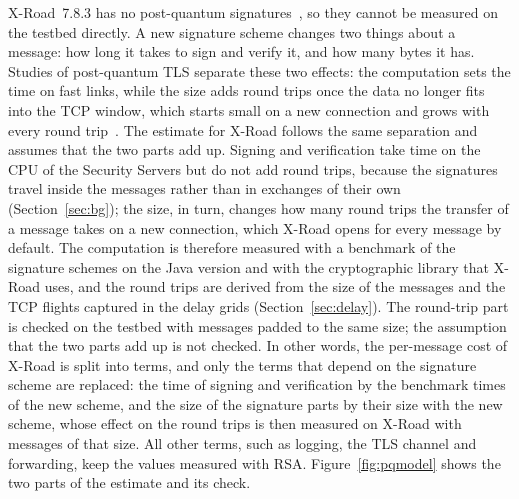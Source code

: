 \documentclass[conference,a4paper]{IEEEtran}
\newcommand{\newtext}[1]{{\color{blue}#1}}
\begin{document}
{\color{blue}X-Road~7.8.3 has no post-quantum signatures~\cite{bakhtina2026pqc,snetkov2023}, so they
cannot be measured on the testbed directly. A new signature scheme changes two things about a
message: how long it takes to sign and verify it, and how many bytes it has. Studies of
post-quantum TLS separate these two effects: the computation sets the time on fast links, while the
size adds round trips once the data no longer fits into the TCP window, which starts small on a new
connection and grows with every round trip~\cite{paquin2020,sikeridis2020}. The estimate for X-Road
follows the same separation and assumes that the two parts add up. Signing and verification take
time on the CPU of the Security Servers but do not add round trips, because the signatures travel
inside the messages rather than in exchanges of their own (Section~\ref{sec:bg}); the size, in turn,
changes how many round trips the transfer of a message takes on a new connection, which X-Road opens
for every message by default. The computation is therefore measured with a benchmark of the
signature schemes on the Java version and with the cryptographic library that X-Road uses, and the
round trips are derived from the size of the messages and the TCP flights captured in the delay
grids (Section~\ref{sec:delay}). The round-trip part is checked on the testbed with messages padded
to the same size; the assumption that the two parts add up is not checked. \newtext{In other words,
the per-message cost of X-Road is split into terms, and only the terms that depend on the signature
scheme are replaced: the time of signing and verification by the benchmark times of the new scheme,
and the size of the signature parts by their size with the new scheme, whose effect on the round
trips is then measured on X-Road with messages of that size. All other terms, such as logging, the
TLS channel and forwarding, keep the values measured with RSA.} \newtext{Figure~\ref{fig:pqmodel}
shows the two parts of the estimate and its check.}

}
\end{document}
